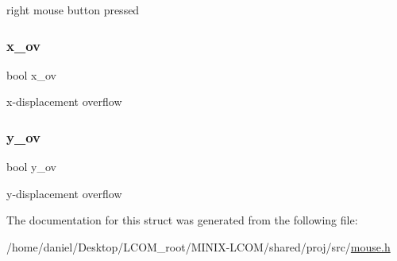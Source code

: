 right mouse button pressed 

\mbox{\label{structmouse__packet_a34fd9f358287cbbc00b4a2e2d9ca894c}} 
\subsubsection{\texorpdfstring{x\+\_\+ov}{x\_ov}}
{\footnotesize\ttfamily bool x\+\_\+ov}



x-\/displacement overflow 

\mbox{\label{structmouse__packet_af53b041fcbe6de2aca94b8ef4189705a}} 
\subsubsection{\texorpdfstring{y\+\_\+ov}{y\_ov}}
{\footnotesize\ttfamily bool y\+\_\+ov}



y-\/displacement overflow 



The documentation for this struct was generated from the following file\+:\begin{DoxyCompactItemize}
\item 
/home/daniel/\+Desktop/\+L\+C\+O\+M\+\_\+root/\+M\+I\+N\+I\+X-\/\+L\+C\+O\+M/shared/proj/src/\hyperlink{mouse_8h}{mouse.\+h}\end{DoxyCompactItemize}
